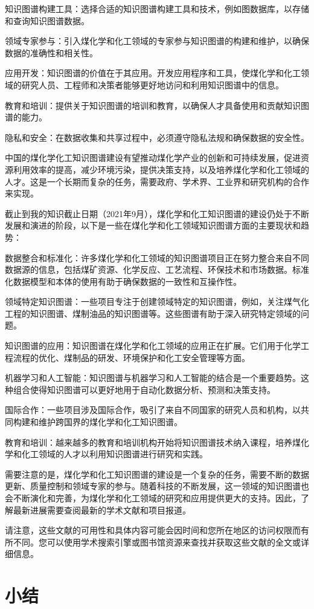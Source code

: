 知识图谱构建工具：选择合适的知识图谱构建工具和技术，例如图数据库，以存储和查询知识图谱数据。

领域专家参与：引入煤化学和化工领域的专家参与知识图谱的构建和维护，以确保数据的准确性和相关性。

应用开发：知识图谱的价值在于其应用。开发应用程序和工具，使煤化学和化工领域的研究人员、工程师和决策者能够更好地访问和利用知识图谱中的信息。

教育和培训：提供关于知识图谱的培训和教育，以确保人才具备使用和贡献知识图谱的能力。

隐私和安全：在数据收集和共享过程中，必须遵守隐私法规和确保数据的安全性。

中国的煤化学化工知识图谱建设有望推动煤化学产业的创新和可持续发展，促进资源利用效率的提高，减少环境污染，提供决策支持，以及培养煤化学和化工领域的人才。这是一个长期而复杂的任务，需要政府、学术界、工业界和研究机构的合作来实现。

截止到我的知识截止日期（2021年9月），煤化学和化工知识图谱的建设仍处于不断发展和演进的阶段，以下是一些在煤化学和化工领域知识图谱方面的主要现状和趋势：

数据整合和标准化：许多煤化学和化工领域的知识图谱项目正在努力整合来自不同数据源的信息，包括煤矿资源、化学反应、工艺流程、环保技术和市场数据。标准化数据模型和本体的使用有助于确保数据的一致性和互操作性。

领域特定知识图谱：一些项目专注于创建领域特定的知识图谱，例如，关注煤气化工程的知识图谱、煤制油品的知识图谱等。这些图谱有助于深入研究特定领域的问题。

知识图谱的应用：知识图谱在煤化学和化工领域的应用正在扩展。它们用于化学工程流程的优化、煤制品的研发、环境保护和化工安全管理等方面。

机器学习和人工智能：知识图谱与机器学习和人工智能的结合是一个重要趋势。这种组合使得知识图谱可以更好地用于自动化数据分析、预测和决策支持。

国际合作：一些项目涉及国际合作，吸引了来自不同国家的研究人员和机构，以共同构建和维护跨国界的煤化学和化工知识图谱。

教育和培训：越来越多的教育和培训机构开始将知识图谱技术纳入课程，培养煤化学和化工领域的人才以利用知识图谱进行研究和实践。

需要注意的是，煤化学和化工知识图谱的建设是一个复杂的任务，需要不断的数据更新、质量控制和领域专家的参与。随着科技的不断发展，这一领域的知识图谱也会不断演化和完善，为煤化学和化工领域的研究和应用提供更大的支持。因此，了解最新进展需要查阅最新的学术文献和项目报道。

请注意，这些文献的可用性和具体内容可能会因时间和您所在地区的访问权限而有所不同。您可以使用学术搜索引擎或图书馆资源来查找并获取这些文献的全文或详细信息。

\section{小结}
